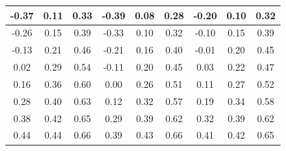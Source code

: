 \begin{enumerate}
\begin{table}[H]
\begin{tabular}{|ccc|ccc|ccc|}
                \multicolumn{1}{|c|}{-0.37}  & \multicolumn{1}{c|}{0.11}     & 0.33                             & \multicolumn{1}{c|}{-0.39}  & \multicolumn{1}{c|}{0.08}     & 0.28                             & \multicolumn{1}{c|}{-0.20}  & \multicolumn{1}{c|}{0.10}     & 0.32                             \\ \hline
                \multicolumn{1}{|c|}{-0.26}  & \multicolumn{1}{c|}{0.15}     & 0.39                             & \multicolumn{1}{c|}{-0.33}  & \multicolumn{1}{c|}{0.10}     & 0.32                             & \multicolumn{1}{c|}{-0.10}  & \multicolumn{1}{c|}{0.15}     & 0.39                             \\ \hline
                \multicolumn{1}{|c|}{-0.13}  & \multicolumn{1}{c|}{0.21}     & 0.46                             & \multicolumn{1}{c|}{-0.21}  & \multicolumn{1}{c|}{0.16}     & 0.40                             & \multicolumn{1}{c|}{-0.01}  & \multicolumn{1}{c|}{0.20}     & 0.45                             \\ \hline
                \multicolumn{1}{|c|}{0.02}   & \multicolumn{1}{c|}{0.29}     & 0.54                             & \multicolumn{1}{c|}{-0.11}  & \multicolumn{1}{c|}{0.20}     & 0.45                             & \multicolumn{1}{c|}{0.03}   & \multicolumn{1}{c|}{0.22}     & 0.47                             \\ \hline
                \multicolumn{1}{|c|}{0.16}   & \multicolumn{1}{c|}{0.36}     & 0.60                             & \multicolumn{1}{c|}{0.00}   & \multicolumn{1}{c|}{0.26}     & 0.51                             & \multicolumn{1}{c|}{0.11}   & \multicolumn{1}{c|}{0.27}     & 0.52                             \\ \hline
                \multicolumn{1}{|c|}{0.28}   & \multicolumn{1}{c|}{0.40}     & 0.63                             & \multicolumn{1}{c|}{0.12}   & \multicolumn{1}{c|}{0.32}     & 0.57                             & \multicolumn{1}{c|}{0.19}   & \multicolumn{1}{c|}{0.34}     & 0.58                             \\ \hline
                \multicolumn{1}{|c|}{0.38}   & \multicolumn{1}{c|}{0.42}     & 0.65                             & \multicolumn{1}{c|}{0.29}   & \multicolumn{1}{c|}{0.39}     & 0.62                             & \multicolumn{1}{c|}{0.32}   & \multicolumn{1}{c|}{0.39}     & 0.62                             \\ \hline
                \multicolumn{1}{|c|}{0.44}   & \multicolumn{1}{c|}{0.44}     & 0.66                             & \multicolumn{1}{c|}{0.39}   & \multicolumn{1}{c|}{0.43}     & 0.66                             & \multicolumn{1}{c|}{0.41}   & \multicolumn{1}{c|}{0.42}     & 0.65                             \\ \hline

\end{tabular}
\end{table}
\end{enumerate}
